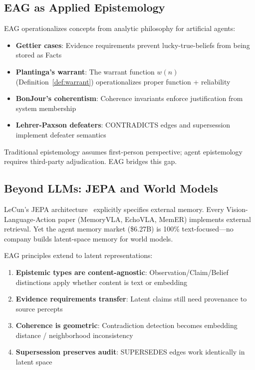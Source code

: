 \documentclass[11pt,a4paper]{article}
\begin{document}
\subsection{EAG as Applied Epistemology}

EAG operationalizes concepts from analytic philosophy for artificial agents:

\begin{itemize}[noitemsep]
    \item \textbf{Gettier cases}: Evidence requirements prevent lucky-true-beliefs from being stored as Facts
    \item \textbf{Plantinga's warrant}: The warrant function $w(n)$ (Definition~\ref{def:warrant}) operationalizes proper function + reliability
    \item \textbf{BonJour's coherentism}: Coherence invariants enforce justification from system membership
    \item \textbf{Lehrer-Paxson defeaters}: CONTRADICTS edges and supersession implement defeater semantics
\end{itemize}

Traditional epistemology assumes first-person perspective; agent epistemology requires third-party adjudication. EAG bridges this gap.

\subsection{Beyond LLMs: JEPA and World Models}

LeCun's JEPA architecture~\cite{lecun2022path} explicitly specifies external memory. Every Vision-Language-Action paper (MemoryVLA, EchoVLA, MemER) implements external retrieval. Yet the agent memory market (\$6.27B) is 100\% text-focused---no company builds latent-space memory for world models.

EAG principles extend to latent representations:
\begin{enumerate}[noitemsep]
    \item \textbf{Epistemic types are content-agnostic}: Observation/Claim/Belief distinctions apply whether content is text or embedding
    \item \textbf{Evidence requirements transfer}: Latent claims still need provenance to source percepts
    \item \textbf{Coherence is geometric}: Contradiction detection becomes embedding distance / neighborhood inconsistency
    \item \textbf{Supersession preserves audit}: SUPERSEDES edges work identically in latent space
\end{enumerate}
\end{document}
